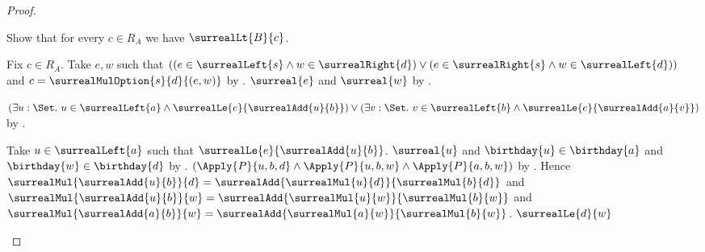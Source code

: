 \begin{proof}
\begin{subproof}
        Show that for every $c\in R_A$ we have $\surrealLt{B}{c}$.
        \begin{subproof}
            Fix $c\in R_A$.
            Take $e,w$ such that
                $((e\in\surrealLeft{s}\land w\in\surrealRight{d})
                  \lor
                  (e\in\surrealRight{s}\land w\in\surrealLeft{d}))$
                and $c=\surrealMulOption{s}{d}{(e,w)}$
                by .
            $\surreal{e}$ and $\surreal{w}$
                by .
            \begin{byCase}
                    $(\exists u:\Set.\ u\in\surrealLeft{a}\land
                            \surrealLe{e}{\surrealAdd{u}{b}})
                        \lor
                        (\exists v:\Set.\ v\in\surrealLeft{b}\land
                            \surrealLe{e}{\surrealAdd{a}{v}})$
                        by .
                    \begin{byCase}
                            Take $u\in\surrealLeft{a}$ such that
                                $\surrealLe{e}{\surrealAdd{u}{b}}$.
                            $\surreal{u}$ and
                                $\birthday{u}\in\birthday{a}$ and
                                $\birthday{w}\in\birthday{d}$
                                by
                                .
                            $(\Apply{P}{u,b,d}
                              \land\Apply{P}{u,b,w}
                              \land\Apply{P}{a,b,w})$
                                by \auto.
                            Hence
                                $\surrealMul{\surrealAdd{u}{b}}{d}
                                    =\surrealAdd{\surrealMul{u}{d}}
                                        {\surrealMul{b}{d}}$ and
                                $\surrealMul{\surrealAdd{u}{b}}{w}
                                    =\surrealAdd{\surrealMul{u}{w}}
                                        {\surrealMul{b}{w}}$ and
                                $\surrealMul{\surrealAdd{a}{b}}{w}
                                    =\surrealAdd{\surrealMul{a}{w}}
                                        {\surrealMul{b}{w}}$.
                            $\surrealLe{d}{w}$

\end{byCase}
\end{byCase}
\end{subproof}
\end{subproof}
\end{proof}
